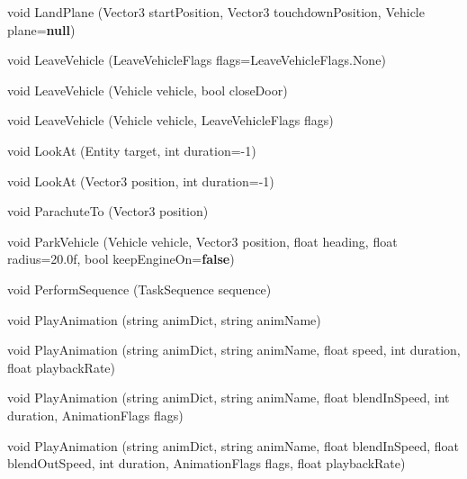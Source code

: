 \documentclass[
  openany]{book}
\newenvironment{Shaded}{\begin{snugshade}}{\end{snugshade}}
\newcommand{\DataTypeTok}[1]{\textcolor[rgb]{0.13,0.29,0.53}{#1}}
\newcommand{\DecValTok}[1]{\textcolor[rgb]{0.00,0.00,0.81}{#1}}
\newcommand{\FloatTok}[1]{\textcolor[rgb]{0.00,0.00,0.81}{#1}}
\newcommand{\FunctionTok}[1]{\textcolor[rgb]{0.00,0.00,0.00}{#1}}
\newcommand{\KeywordTok}[1]{\textcolor[rgb]{0.13,0.29,0.53}{\textbf{#1}}}
\newcommand{\NormalTok}[1]{#1}
\begin{document}
\begin{Shaded}
\begin{Highlighting}[]
\DataTypeTok{void} \FunctionTok{LandPlane}\NormalTok{ (Vector3 startPosition, Vector3 touchdownPosition, Vehicle plane=}\KeywordTok{null}\NormalTok{)}
 
\DataTypeTok{void} \FunctionTok{LeaveVehicle}\NormalTok{ (LeaveVehicleFlags flags=LeaveVehicleFlags.}\FunctionTok{None}\NormalTok{)}
 
\DataTypeTok{void} \FunctionTok{LeaveVehicle}\NormalTok{ (Vehicle vehicle, }\DataTypeTok{bool}\NormalTok{ closeDoor)}
 
\DataTypeTok{void} \FunctionTok{LeaveVehicle}\NormalTok{ (Vehicle vehicle, LeaveVehicleFlags flags)}
 
\DataTypeTok{void} \FunctionTok{LookAt}\NormalTok{ (Entity target, }\DataTypeTok{int}\NormalTok{ duration=-}\DecValTok{1}\NormalTok{)}

\DataTypeTok{void} \FunctionTok{LookAt}\NormalTok{ (Vector3 position, }\DataTypeTok{int}\NormalTok{ duration=-}\DecValTok{1}\NormalTok{)}
  
\DataTypeTok{void} \FunctionTok{ParachuteTo}\NormalTok{ (Vector3 position)}
 
\DataTypeTok{void} \FunctionTok{ParkVehicle}\NormalTok{ (Vehicle vehicle, Vector3 position, }\DataTypeTok{float}\NormalTok{ heading, }\DataTypeTok{float}\NormalTok{ radius=}\FloatTok{20.0f}\NormalTok{, }\DataTypeTok{bool}\NormalTok{ keepEngineOn=}\KeywordTok{false}\NormalTok{)}
 
\DataTypeTok{void} \FunctionTok{PerformSequence}\NormalTok{ (TaskSequence sequence)}
 
\DataTypeTok{void} \FunctionTok{PlayAnimation}\NormalTok{ (}\DataTypeTok{string}\NormalTok{ animDict, }\DataTypeTok{string}\NormalTok{ animName)}
 
\DataTypeTok{void} \FunctionTok{PlayAnimation}\NormalTok{ (}\DataTypeTok{string}\NormalTok{ animDict, }\DataTypeTok{string}\NormalTok{ animName, }\DataTypeTok{float}\NormalTok{ speed, }\DataTypeTok{int}\NormalTok{ duration, }\DataTypeTok{float}\NormalTok{ playbackRate)}
 
\DataTypeTok{void} \FunctionTok{PlayAnimation}\NormalTok{ (}\DataTypeTok{string}\NormalTok{ animDict, }\DataTypeTok{string}\NormalTok{ animName, }\DataTypeTok{float}\NormalTok{ blendInSpeed, }\DataTypeTok{int}\NormalTok{ duration, AnimationFlags flags)}
 
\DataTypeTok{void} \FunctionTok{PlayAnimation}\NormalTok{ (}\DataTypeTok{string}\NormalTok{ animDict, }\DataTypeTok{string}\NormalTok{ animName, }\DataTypeTok{float}\NormalTok{ blendInSpeed, }\DataTypeTok{float}\NormalTok{ blendOutSpeed, }\DataTypeTok{int}\NormalTok{ duration, AnimationFlags flags, }\DataTypeTok{float}\NormalTok{ playbackRate)}
 

\end{Highlighting}
\end{Shaded}
\end{document}
